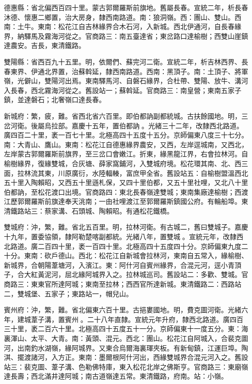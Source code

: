 \begin{pinyinscope}
德惠縣：省北偏西百四十里。蒙古郭爾羅斯前旗地。舊屬長春。宣統二年，析長春沐德、懷惠二鄉置，治大房身，隸西南路道。南：狼洞嶺。西：團山、雙山。西南：土牛。東南：松花江自吉林緣界合木石河，入新城。西北伊通河，自長春緣界，納驛馬及霧海河從之。官商路三：南五臺達省；東岔路口達榆樹；西雙山崖鎮達農安。吉長，東清鐵路。

雙陽縣：省西百九十五里。明，依爾們、蘇完河二衛。宣統二年，析吉林西界、長春東界、伊通北界置，治蘇斡延，隸西南路道。西南：黑頂子。南：土頂子、將軍嶺，光僻山，雙陽河出焉。東南驛馬河、自磐石緣界，合杜帶、雙陽、放牛、溝河入長春，西北霧海河從之。舊設站一；蘇斡延。官商路三：南皇營；東南五家子鎮，並達磐石；北奢嶺口達長春。

新城府：繁，疲，難。省西北省六百里。即伯都訥副都統城。古扶餘國地。明，三岔河衛。後屬烏拉部。嘉慶十五年，置伯都訥。光緒三十二年，改隸西北路道。廣四百二十里，袤一百七十里。北極高四十五度十五分。京師偏東八度三十七分。南：大青山、鷹山。東南：松花江自德惠緣界農安，又西，左岸逕城南，又西北，左岸蒙古郭爾羅斯前旗界，至三岔口會嫩江。折東，緣黑龍江界，右會拉林河。自榆樹緣界，復緣雙城，合灰塘、薛家窩鋪河，入雙城府境。松花環其南、北、西三面，拉林流其東，川原廣衍，水陸輻輳，富庶甲全省。舊設站五：自榆樹盟溫西北五十里入陶賴昭，又西五十里遜札保，又四十里伯都，又五十里社哩，又北八十里伯都訥，至松花渡口出境。官商路四：東北長春嶺達雙城；東南集廠達榆樹；西渡江歷郭爾羅斯前旗達奉天洮南；一由社哩渡江至郭爾羅斯鎮國公府。有輪船埠。東清鐵路站三：蔡家溝、石頭城、陶賴昭。有通松花鐵橋。

雙城府：沖，繁，難。省北五百里。明，拉林河衛。有古城二，舊曰雙城子。嘉慶十九年，置委協領，隸阿勒楚喀副都統。光緒八年，置雙城。宣統元年，改隸西北路道。廣二百四十里，袤一百四十里。北極高四十五度四十分。京師偏東九度二十分。東南：砍戶德山。西北：松花江自新城會拉林河，東南自五常入，緣榆樹、新城界，合朝陽葦塘河，入濱江。東：阿什河自賓州緣界，合混元河，逕小青頂子，合大紅黃泥河，屈北緣阿城界入之。拉林城巡司。舊設站二：多歡、雙城。官商路三：東東官所達阿城；東南至拉林；西西官所達新城。東清鐵路二：西路站二，雙城堡、五家子；東路站一，帽兒山。

賓州府：沖，繁，難。省北偏東六百十里。古挹婁國地。明，費克圖河衛。光緒六年，建城葦子溝，置賓州。二十八年直隸。宣統元年升府，隸西北路道。廣四百三十里，袤二百六十里。北極高四十五度五十一分。京師偏東十一度五分。東：海裏渾山、太平、大青。南：黃頭、混元。西北：團山。松花江自阿城入，合裴克圖河，出南釣水湖嶺，緣阿城界。又東合烏爾海裏琿夾板。有新甸鎮，江運巨埠。陶淇、擺渡諸河，入方正。東南：墨爾根阿什河出，西緣雙城界合混元河入之。舊設站三：裴克圖、葦子溝、色勒佛特庫，東入松花北岸之佛斯亨。官商路三：東廟嶺達長壽；西北滿井達阿城；南古道嶺達五常。東清鐵路，府南。站：小嶺。


\end{pinyinscope}
